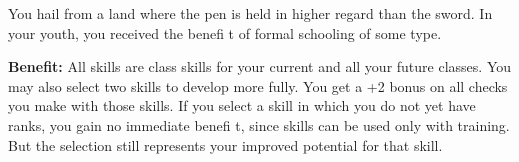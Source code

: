 
You hail from a land where the pen is held in higher regard than the sword. In your youth, you received the benefi t of formal schooling of some type.

\textbf{Benefit:} All  skills are class skills for your current and all your future classes. You may also select two  skills to develop more fully. You get a +2 bonus on all checks you make with those skills. If you select a  skill in which you do not yet have ranks, you gain no immediate benefi t, since  skills can be used only with training. But the selection still represents your improved potential for that skill.
